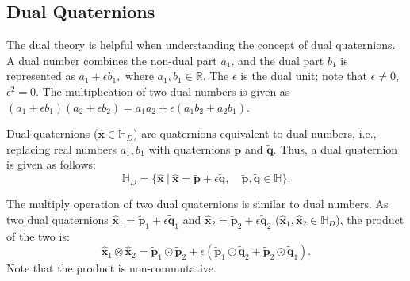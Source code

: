 \documentclass[micromachines,article,accept,pdftex,moreauthors]{Definitions/mdpi}
\begin{document}

\subsection{Dual Quaternions} \label{2.3}
The dual theory is helpful when understanding the concept of dual quaternions. A dual number combines  the non-dual part $a_1$, and the dual part $b_1$ is represented as $a_1 + \epsilon b_1,$ where $a_1, b_1\in \mathbb{R}$. The $\epsilon$ is the dual unit; note that $\epsilon \neq 0$, $\epsilon^2 = 0$. The multiplication of two dual numbers is given as $(a_1 + \epsilon b_1)(a_2 + \epsilon b_2 ) = a_1a_2 + \epsilon(a_1b_2 + a_2b_1).$

Dual quaternions ($\widehat{\boldsymbol{x}} \in \mathbb{H}_D$) are quaternions equivalent to dual numbers, i.e., replacing real numbers $a_1, b_1$ with quaternions $\widetilde{\boldsymbol{p}}$ and $\widetilde{\boldsymbol{q}}$. Thus, a dual quaternion is given as follows:
\begin{equation} \label{eq:5}
    \mathbb{H}_D = \{ \widehat{\boldsymbol{x}} {\ }| {\ } \widehat{\boldsymbol{x}} = \widetilde{\boldsymbol{p}} + \epsilon
    \widetilde{\boldsymbol{q}}, \quad
    \widetilde{\boldsymbol{p}}, \widetilde{\boldsymbol{q}} \in \mathbb{H} \}.
\end{equation}

The multiply operation of two dual quaternions is similar to dual numbers. As two dual quaternions $\widehat{\boldsymbol{x}}_1 = \widetilde{\boldsymbol{p}}_1 + \epsilon \widetilde{\boldsymbol{q}}_1$ and  $ \widehat{\boldsymbol{x}}_2 = \widetilde{\boldsymbol{p}}_2 + \epsilon \widetilde{\boldsymbol{q}}_2$ ($\widehat{\boldsymbol{x}}_1, \widehat{\boldsymbol{x}}_2 \in \mathbb{H}_D$), the product of the two is:
\begin{equation} \label{eq:6}
\widehat{\boldsymbol{x}}_{1} \otimes \widehat{\boldsymbol{x}}_{2}=\widetilde{\boldsymbol{p}}_{1} \odot \widetilde{\boldsymbol{p}}_{2}+\epsilon\left(\widetilde{\boldsymbol{p}}_{1} \odot \widetilde{\boldsymbol{q}}_{2}+\widetilde{\boldsymbol{p}}_{2} \odot \widetilde{\boldsymbol{q}}_{1}\right).
\end{equation}
Note that the product is non-commutative.
\end{document}
